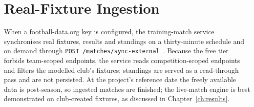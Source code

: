 \section{Real-Fixture Ingestion}
\label{app:deploy-ingest}

When a football-data.org key is configured, the training-match service synchronises real
fixtures, results and standings on a thirty-minute schedule and on demand through
\texttt{POST /matches/sync-external}~\cite{footballdata}. Because the free tier forbids
team-scoped endpoints, the service reads competition-scoped endpoints and filters the
modelled club's fixtures; standings are served as a read-through pass and are not persisted.
At the project's reference date the freely available data is post-season, so ingested matches
are finished; the live-match engine is best demonstrated on club-created fixtures, as
discussed in Chapter~\ref{ch:results}.
